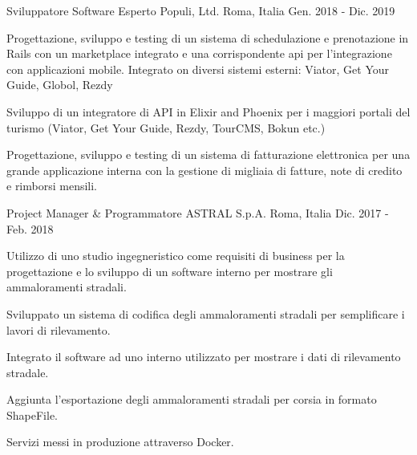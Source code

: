 

\begin{cventries}

  \cventry
    {Sviluppatore Software Esperto} %
    {Populi, Ltd.} %
    {Roma, Italia} %
    {Gen. 2018 - Dic. 2019} %
    {
      \begin{cvitems} %
        \item {Progettazione, sviluppo e testing di un sistema di schedulazione e prenotazione in Rails con un marketplace integrato e una corrispondente api per l'integrazione con applicazioni mobile. Integrato on diversi sistemi esterni: Viator, Get Your Guide, Globol, Rezdy}
        \item {Sviluppo di un integratore di API in Elixir and Phoenix per i maggiori portali del turismo (Viator, Get Your Guide, Rezdy, TourCMS, Bokun etc.)}
        \item {Progettazione, sviluppo e testing di un sistema di fatturazione elettronica per una grande applicazione interna con la gestione di migliaia di fatture, note di credito e rimborsi mensili.}
      \end{cvitems}
    }

  \cventry
    {Project Manager \& Programmatore} %
    {ASTRAL S.p.A.} %
    {Roma, Italia} %
    {Dic. 2017 - Feb. 2018} %
    {
      \begin{cvitems} %
        \item {Utilizzo di uno studio ingegneristico come requisiti di business per la progettazione e lo sviluppo di un software interno per mostrare gli ammaloramenti stradali.}
        \item {Sviluppato un sistema di codifica degli ammaloramenti stradali per semplificare i lavori di rilevamento.}
        \item {Integrato il software ad uno interno utilizzato per mostrare i dati di rilevamento stradale.}
        \item {Aggiunta l'esportazione degli ammaloramenti stradali per corsia in formato ShapeFile.}
        \item {Servizi messi in produzione attraverso Docker.}
      \end{cvitems}
    }


\end{cventries}
